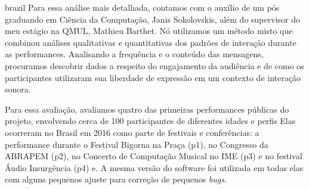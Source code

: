 \begin{otherlanguage*}{brazil}
Para essa análise mais detalhada, contamos com o auxílio de um pós graduando em Ciência da Computação, Janis Sokolovskis, além do supervisor do meu estágio na QMUL, Mathieu Barthet. Nó utilizamos um método misto que combinou análises qualitativas e quantitativas dos padrões de interação durante as performances. Analisando a frequência e o conteúdo das mensagens, procuramos descobrir dados a respeito do engajamento da audiência e de como os participantes utilizaram sua liberdade de expressão em um contexto de interação sonora. 


Para essa avaliação, avaliamos quatro das primeiras performances públicas do projeto, envolvendo cerca de 100 participantes de diferentes idades e perfis Elas ocorreram no Brasil em 2016 como parte de festivais e conferências: a performance durante o Festival Bigorna na Praça (p1), no Congresso da ABRAPEM (p2), no Concerto de Computação Musical no IME (p3) e no festival Áudio Insurgência (p4) e. A mesma versão do software foi utilizada em todas elas com alguns pequenos ajuste para correção de pequenos \emph{bugs}.








\end{otherlanguage*}
